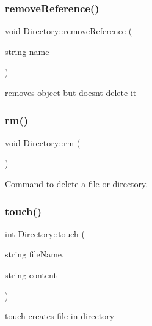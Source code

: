 \mbox{\label{class_directory_a87a23d283d18c5c2a521e2f2dbccb390}} 
\subsubsection{\texorpdfstring{remove\+Reference()}{removeReference()}}
{\footnotesize\ttfamily void Directory\+::remove\+Reference (\begin{DoxyParamCaption}\item[{string}]{name }\end{DoxyParamCaption})}



removes object but doesnt delete it 

\mbox{\label{class_directory_ad764e9b4d0568c0acf788a15e0621f1a}} 
\subsubsection{\texorpdfstring{rm()}{rm()}}
{\footnotesize\ttfamily void Directory\+::rm (\begin{DoxyParamCaption}{ }\end{DoxyParamCaption})}



Command to delete a file or directory. 

\mbox{\label{class_directory_abe82fee2bf7d59d277133848d8c9833d}} 
\subsubsection{\texorpdfstring{touch()}{touch()}\hspace{0.1cm}{\footnotesize\ttfamily [1/2]}}
{\footnotesize\ttfamily int Directory\+::touch (\begin{DoxyParamCaption}\item[{string}]{file\+Name,  }\item[{string}]{content }\end{DoxyParamCaption})}



touch creates file in directory 

